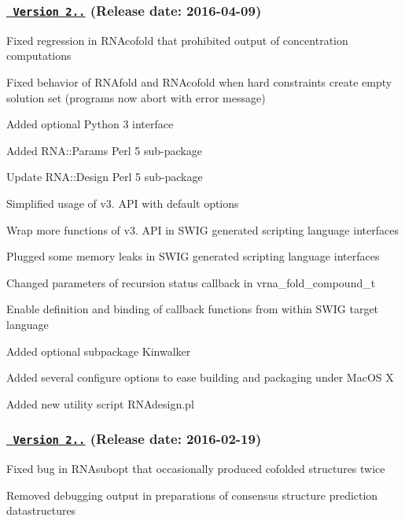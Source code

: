 \subsubsection*{\href{https://github.com/ViennaRNA/ViennaRNA/compare/v2.2.4...v2.2.5}{\texttt{ Version 2..}} (Release date\+: 2016-\/04-\/09)}


\begin{DoxyItemize}
\item Fixed regression in R\+N\+Acofold that prohibited output of concentration computations
\item Fixed behavior of R\+N\+Afold and R\+N\+Acofold when hard constraints create empty solution set (programs now abort with error message)
\item Added optional Python 3 interface
\item Added R\+N\+A\+::\+Params Perl 5 sub-\/package
\item Update R\+N\+A\+::\+Design Perl 5 sub-\/package
\item Simplified usage of v3. A\+PI with default options
\item Wrap more functions of v3. A\+PI in S\+W\+IG generated scripting language interfaces
\item Plugged some memory leaks in S\+W\+IG generated scripting language interfaces
\item Changed parameters of recursion status callback in vrna\+\_\+fold\+\_\+compound\+\_\+t
\item Enable definition and binding of callback functions from within S\+W\+IG target language
\item Added optional subpackage Kinwalker
\item Added several configure options to ease building and packaging under Mac\+OS X
\item Added new utility script R\+N\+Adesign.\+pl
\end{DoxyItemize}

\subsubsection*{\href{https://github.com/ViennaRNA/ViennaRNA/compare/v2.2.3...v2.2.4}{\texttt{ Version 2..}} (Release date\+: 2016-\/02-\/19)}


\begin{DoxyItemize}
\item Fixed bug in R\+N\+Asubopt that occasionally produced cofolded structures twice
\item Removed debugging output in preparations of consensus structure prediction datastructures
\end{DoxyItemize}

